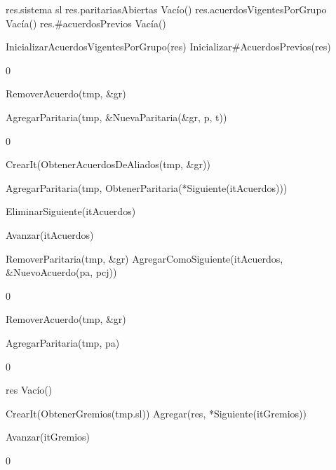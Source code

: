 {
	\state res.sistema \asig sl						
	\state res.paritariasAbiertas \asig Vacío()		
	\state res.acuerdosVigentesPorGrupo \asig Vacía()		
	\state res.\#acuerdosPrevios \asig Vacía()		
	\state

	\state InicializarAcuerdosVigentesPorGrupo(res)			
	\state Inicializar\#AcuerdosPrevios(res)		
}
{0}
{\addtocounter{lipsumcounter}{1}}

{
							
		\state RemoverAcuerdo(tmp, \&gr)							
	\endif
	\state

	\state AgregarParitaria(tmp, \&NuevaParitaria(\&gr, p, t))		
}
{0}
{\addtocounter{lipsumcounter}{1}}

{

	\state {} \asig CrearIt(ObtenerAcuerdosDeAliados(tmp, \&gr))		
			
		\state

		\state AgregarParitaria(tmp, ObtenerParitaria(*Siguiente(itAcuerdos)))		

		\state EliminarSiguiente(itAcuerdos)										

		\state
		\state Avanzar(itAcuerdos)													
	\endwhile
	\state

	\state {} \asig RemoverParitaria(tmp, \&gr)		
	\state AgregarComoSiguiente(itAcuerdos, \&NuevoAcuerdo(pa, pcj))			
}
{0}
{\addtocounter{lipsumcounter}{1}}

{
	\state {} \asig RemoverAcuerdo(tmp, \&gr)			

	\state AgregarParitaria(tmp, pa)											
}
{0}
{\addtocounter{lipsumcounter}{1}}

{
	\state res \asig Vacío()								

	\state
	\state {} \asig CrearIt(ObtenerGremios(tmp.sl))						
					
		\state
		\state Agregar(res, *Siguiente(itGremios))			

		\state
		\state Avanzar(itGremios)						
	\endwhile
}
{0}
{\addtocounter{lipsumcounter}{1}}

